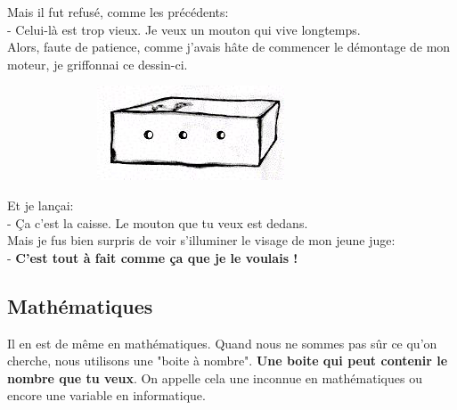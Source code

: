 \documentclass[12pt]{article}
\begin{document}
\begin{multicols}{2}
  Mais il fut refusé, comme les précédents: \\
  - Celui-là est trop vieux. Je veux un mouton qui vive longtemps. \\
  Alors, faute de patience, comme j'avais hâte de commencer le démontage de mon moteur, je griffonnai ce dessin-ci.
  
  \begin{figure}[H]
        \centering
        \includegraphics[width=0.5\linewidth]{3x2-calcul-litteral-1/sources/dm-mouton4.png}
  \end{figure}

  Et je lançai: \\
  - Ça c'est la caisse. Le mouton que tu veux est dedans. \\
  Mais je fus bien surpris de voir s'illuminer le visage de mon jeune juge: \\
  - \textbf{C'est tout à fait comme ça que je le voulais ! }
\end{multicols}

\subsection*{Mathématiques}
Il en est de même en mathématiques. Quand nous ne sommes pas sûr ce qu’on cherche, nous utilisons une "boite à nombre". \textbf{Une boite qui peut contenir le nombre que tu veux}. On appelle cela une inconnue en mathématiques ou encore une variable en informatique. \\

\vspace{0.4cm}
\end{document}
